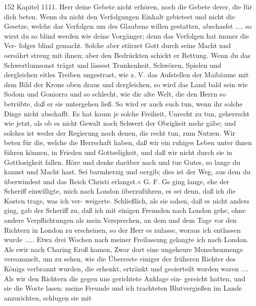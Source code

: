 152 Kapitel 1111.
Herr deine Gebete nicht erhören, noch die Gebete derer, die für
dich beten. Wenn du nicht den Verfolgungen Einhalt gebietest
und nicht die Gesetze, welche das Verfolgen um des Glaubens
willen gestatten, abschasfst .... so wirst du so blind werden
wie deine Vorgänger; denn das Verfolgen hat immer die Ver-
folger blind gemacht. Solche aber stiirzet Gott durch seine Macht
nnd oersährt streng mit ihnen; aber den Bedrückten schickt er
Rettung. Wenn du das Schwertlumsonst trägst und lässest
Trunkenheit, Schwören, Spielen und dergleichen eitles Treiben
ungestrast, wie z. V. das Aufstellen der Maibäume mit dem Bild
der Krone oben draus und dergleichen, so wird das Land bald
sein wie Sodom und Goniorra und so schlecht, wie die alte Welt,
die den Herrn so betrübte, daß er sie untergehen ließ. So wird
er auch euch tun, wenn ihr solche Dinge nicht abschafft. Es hat
kaum je solche Freiheit, Unrecht zu tun, geherrscht wie jetzt, als
ob es nicht Gewalt noch Schwert der Obrigkeit mehr gäbe; und
solches ist weder der Regierung noch denen, die recht tun, zum
Nutzen. Wir beten für die, welche die Herrschaft haben, daß
wir ein ruhiges Leben unter ihnen führen können, in Frieden
und Gottseligkeit, und daß wir nicht durch sie in Gottlosigkeit
fallen. Höre und denke darüber nach und tue Gutes, so lange
du kannst und Macht hast. Sei barmherzig und oergib; dies
ist der Weg, aus dem du überwindest und das Reich Christi
erlangst.« G. F.
Gs ging lange, ehe der Scheriff einwilligte, mich nach London
iiberzuführen, es sei denn, daß ich die Kosten trage, was ich ver-
weigerte. Schließlich, als sie sahen, daß es nicht anders ging,
gab der Scheriff zu, daß ich mit einigen Freunden nach London
gehe, ohne andere Verpflichtungen als mein Versprechen, an
dem und dem Tage vor den Richtern in London zu erscheinen,
so der Herr es zulasse, woraus ich entlassen wurde .....
Etwa drei Wochen nach meiner Freilassung gelangte ich nach
London. Als swir nach Charing Eroß kamen, Zwar dort eine
ungeheure Menschenmenge versammelt, um zu sehen, wie die
Überreste einiger der früheren Richter des Königs verbrannt
wurden, die erhenkt, ertränkt und geoierteilt worden waren ....
Als wir den Richtern die gegen uns gerichtete Anklage ein-
gereicht hatten, und sie die Worte lasen: meine Freunde und ich
trachteten Blutvergießen im Lande anzurichten, schlugen sie mit


